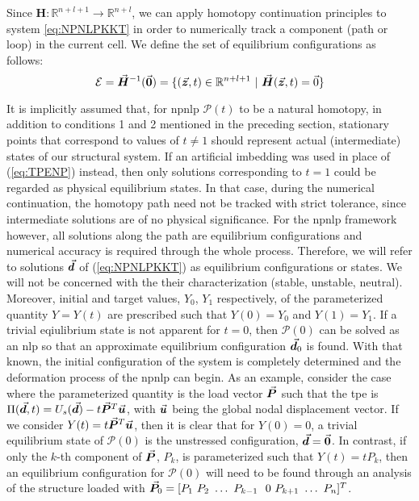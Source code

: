 \noindent Since $\bm{H}:\mathbb{R}^{n+l+1}\rightarrow\mathbb{R}^{n+l}$, we can 
apply homotopy continuation principles to system \ref{eq:NPNLPKKT} in order to 
numerically track a component (path or loop) in the current cell. We define the 
set of equilibrium configurations as follows:
\begin{equation}
	\mathcal{E} =\vec{\boldsymbol{H}}^{-1}(\vec{\boldsymbol{0}})= 
	\{(\vec{\boldsymbol{z}},t)\in\mathbb{R}^{n+l+1}\ |\
	\vec{\boldsymbol{H}}(\vec{\boldsymbol{z}},t)=\vec{0}\}
	\label{eq:EQset}
\end{equation}

It is implicitly assumed that, for \acrshort{npnlp} $\bm{\mathcal{P}}(t)$ to be 
a natural homotopy, in addition to conditions 1 and 2 mentioned in the 
preceding
section, stationary points that correspond to values of $t\neq 1$ should
represent actual (intermediate) states of our structural system.  If an
artificial imbedding was used in place of (\ref{eq:TPENP}) instead, then only 
solutions
corresponding to $t=1$ could be regarded as physical equilibrium states. 
In that case, during the
numerical continuation, the homotopy path need not be tracked with strict
tolerance, since intermediate solutions are of no physical significance. For
the \acrshort{npnlp} framework however, all solutions along the path are
equilibrium configurations and numerical accuracy is required through the whole
process. Therefore, we will refer to solutions $\vec{\boldsymbol{d}}$ of 
(\ref{eq:NPNLPKKT}) 
as equilibrium configurations or states. We will not be concerned with the 
their 
characterization (stable, unstable, neutral).
Moreover, initial and target
values, $Y_0$, $Y_1$ respectively, of the parameterized quantity $Y=Y(t)$ 
are prescribed such that $Y(0)=Y_0$ and $Y(1)=Y_1$. If a trivial eqiulibrium 
state is not 
apparent for $t=0$, then $\bm{\mathcal{P}}(0)$ can be solved as an 
\acrshort{nlp}
so that an approximate equilibrium configuration $\vec{\boldsymbol{d}}_0$ is 
found. With that known, the initial configuration of the system is 
completely determined and the deformation process of the \acrshort{npnlp} can 
begin. As an example, 
consider the case where the parameterized quantity is the load vector 
$\vec{\boldsymbol{P}}$ 
such that the \acrshort{tpe} is $\Pi(\vec{\boldsymbol{d}},t)
= U_s(\vec{\boldsymbol{d}})-t\vec{\boldsymbol{P}}^T\vec{\boldsymbol{u}}$, with $\vec{\boldsymbol{u}}$ being the global nodal 
displacement 
vector. If we consider
$Y(t)=t\vec{\boldsymbol{P}}^T\vec{\boldsymbol{u}}$, then it is clear that for $Y(0)=0$, a
trivial equilibrium state of $\bm{\mathcal{P}}(0)$ is the unstressed
configuration, $\vec{\boldsymbol{d}}=\vec{\boldsymbol{0}}$. In contrast, if only the $k$-th component 
of $\vec{\boldsymbol{P}}$, $P_k$, is parameterized such that $Y(t) = t P_k$, then
an equilibrium configuration for $\bm{\mathcal{P}}(0)$ will need to be found 
through an analysis of the structure loaded with $\vec{\boldsymbol{P}}_0=[P_1\ P_2\ \dots\
P_{k-1}\ \ 0\ P_{k+1}\ \dots\ P_n]^T$.

